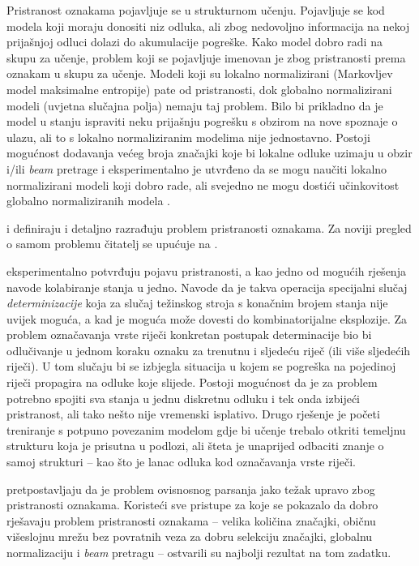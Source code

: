 Pristranost oznakama  pojavljuje se u strukturnom učenju.
Pojavljuje se kod modela koji moraju donositi niz odluka, ali zbog nedovoljno
informacija na nekoj prijašnjoj odluci dolazi do akumulacije pogreške. Kako
model dobro radi na skupu za učenje, problem koji se pojavljuje imenovan je zbog
pristranosti prema oznakam u skupu za učenje. Modeli koji su lokalno
normalizirani (Markovljev model maksimalne entropije) pate od pristranosti, dok
globalno normalizirani modeli (uvjetna slučajna polja) nemaju taj problem. Bilo
bi prikladno da je model u stanju ispraviti neku prijašnju pogrešku s obzirom na
nove spoznaje o ulazu, ali to s lokalno normaliziranim modelima nije
jednostavno. Postoji mogućnost dodavanja većeg broja značajki koje bi lokalne
odluke uzimaju u obzir i/ili \textit{beam} pretrage i eksperimentalno je
utvrđeno da se mogu naučiti lokalno normalizirani modeli koji dobro rade, ali
svejedno ne mogu dostići učinkovitost globalno normaliziranih modela
\citep{liang2008structure}.

\citet*{lafferty2001conditional} i \citet*{leon1991approche} definiraju i
detaljno razrađuju problem pristranosti oznakama. Za noviji pregled o samom
problemu čitatelj se upućuje na \citep{andor2016globally}.

\citet*{lafferty2001conditional} eksperimentalno potvrđuju pojavu pristranosti,
a kao jedno od mogućih rješenja navode kolabiranje stanja u jedno. Navode da je
takva operacija specijalni slučaj \emph{determinizacije} koja za slučaj
težinskog stroja s konačnim brojem stanja nije uvijek moguća, a kad je moguća
može dovesti do kombinatorijalne eksplozije. Za problem označavanja vrste riječi
konkretan postupak determinacije bio bi odlučivanje u jednom koraku oznaku za
trenutnu i sljedeću riječ (ili više sljedećih riječi). U tom slučaju bi se
izbjegla situacija u kojem se pogreška na pojedinoj riječi propagira na odluke
koje slijede. Postoji mogućnost da je za problem potrebno spojiti sva stanja u
jednu diskretnu odluku i tek onda izbijeći pristranost, ali tako nešto nije
vremenski isplativo. Drugo rješenje je početi treniranje s potpuno povezanim
modelom gdje bi učenje trebalo otkriti temeljnu strukturu koja je prisutna u
podlozi, ali šteta je unaprijed odbaciti znanje o samoj strukturi -- kao što je
lanac odluka kod označavanja vrste riječi.

\citet{andor2016globally} pretpostavljaju da je problem ovisnosnog parsanja jako
težak upravo zbog pristranosti oznakama. Koristeći sve pristupe za koje se
pokazalo da dobro rješavaju problem pristranosti oznakama -- velika količina
značajki, običnu višeslojnu mrežu bez povratnih veza za dobru selekciju
značajki, globalnu normalizaciju i \textit{beam} pretragu -- ostvarili su
najbolji rezultat na tom zadatku.

